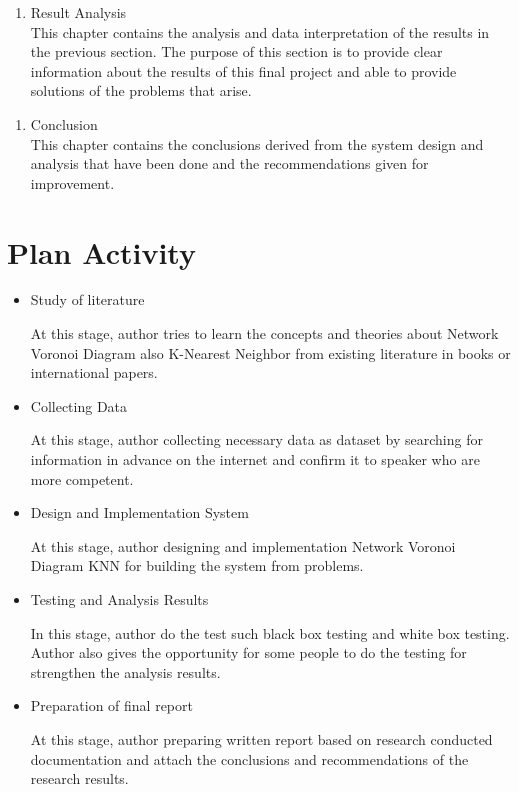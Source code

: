 \begin{enumerate}[label=Chapter V \hspace{3.5mm} : \hspace{2mm}, leftmargin=*, topsep=0pt, itemsep=-1ex, partopsep=1ex, parsep=1ex]
\item Result Analysis\\This chapter contains the analysis and data interpretation of the results in the previous section. The purpose of this section is to provide clear information about the results of this final project and able to provide solutions of the problems that arise.
\end{enumerate}
\begin{enumerate}[label=Chapter VI \hspace{2mm} : \hspace{2mm}, leftmargin=*, topsep=0pt, itemsep=-1ex, partopsep=1ex, parsep=1ex]
\item Conclusion\\This chapter contains the conclusions derived from the system design and analysis that have been done and the recommendations given for improvement.
\end{enumerate}
\else
\section{Plan Activity}
\begin{itemize}
	\item Study of literature
	
	At this stage, author tries to learn the concepts and theories about Network Voronoi Diagram also K-Nearest Neighbor from existing literature in books or international papers.
	\item Collecting Data

At this stage, author collecting necessary data as dataset by searching for information in advance on the internet and confirm it to speaker who are more competent.
\pagebreak
	\item Design and Implementation System

At this stage, author designing and implementation Network Voronoi Diagram KNN for building the system from problems.
	\item Testing and Analysis Results

In this stage, author do the test such  black box testing and white box testing. Author also gives the opportunity for some people to do the testing for strengthen the analysis results.
	\item Preparation of final report

At this stage, author preparing written report based on research conducted documentation and attach the conclusions and recommendations of the research results.
\end{itemize}

\fi
